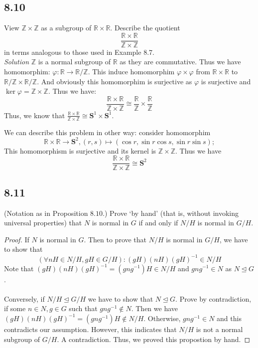 \documentclass[a4paper, pdf, 12pt]{article}
\begin{document}
\subsection*{8.10}
View $\mathbb{Z}\times \mathbb{Z}$ as a subgroup of $\mathbb{R}\times \mathbb{R}$. 
Describe the quotient
$$
\frac{\mathbb{R}\times \mathbb{R}}{\mathbb{Z}\times \mathbb{Z}}
$$
in terms analogous to those used in Example 8.7.\\
\noindent
\textit{Solution}
$\mathbb{Z}$ is a normal subgroup of $\mathbb{R}$ as they are commutative. Thus we have 
homomorphim: $\varphi:\mathbb{R}\longrightarrow \mathbb{R}/\mathbb{Z}$. This induce homomorphim 
$\varphi\times \varphi$
from $\mathbb{R}\times \mathbb{R}$ to $\mathbb{R}/\mathbb{Z}\times \mathbb{R}/\mathbb{Z}$.
And obviously this homomorphim is surjective as $\varphi$ is surjective and $\ker \varphi = \mathbb{Z}\times \mathbb{Z}$.
Thus we have:
$$
\frac{\mathbb{R}\times \mathbb{R}}{\mathbb{Z}\times \mathbb{Z}}\cong \frac{\mathbb{R}}{\mathbb{Z}}\times \frac{\mathbb{R}}{\mathbb{Z}}
$$
Thus, we know that $\displaystyle \frac{\mathbb{R}\times \mathbb{R}}{\mathbb{Z}\times \mathbb{Z}}\cong \mathbf{S}^{1}\times \mathbf{S}^{1}$. 

\noindent
We can describe this problem in other way: consider homomorphim 
$$
\mathbb{R}\times \mathbb{R}\longrightarrow \mathbf{S}^{2}, (r,s)\mapsto (\cos r, \sin r\cos s, \sin r\sin s);
$$
This homomorphism is surjective and its kernel is $\mathbb{Z}\times \mathbb{Z}$. Thus we have 
$$
\frac{\mathbb{R}\times \mathbb{R}}{\mathbb{Z}\times \mathbb{Z}}\cong \mathbf{S}^{2}
$$

\subsection*{8.11}
(Notation as in Proposition $8.10.$) Prove ‘by hand’ (that is, without invoking universal properties) 
that $N$ is normal in $G$ if and only if $N/H$ is normal in $G/H$.
\begin{proof}
  If $N$ is normal in $G$. Then to prove that $N/H$ is normal in $G/H$, we have to show that 
  $$
  (\forall nH\in N/H, gH\in G/H): (gH)(nH)(gH)^{-1}\in N/H
  $$
  Note that $(gH)(nH)(gH)^{-1} = (gng^{-1})H\in N/H$ and $gng^{-1}\in N$ as $N\trianglelefteq G$.\\
  \\
  Conversely, if $N/H \trianglelefteq G/H$ we have to show that $N\trianglelefteq G$. Prove by contradiction, if some 
  $n\in N, g\in G$ such that $gng^{-1}\notin N$. Then we have $(gH)(nH)(gH)^{-1} = (gng^{-1})H\notin N/H$. Otherwise, $gng^{-1}\in N$ and this 
  contradicts our assumption. However, this indicates that $N/H$ is not a normal subgroup of $G/H$. A contradiction. Thus, we proved this propostion
  by hand.
\end{proof}
\end{document}
